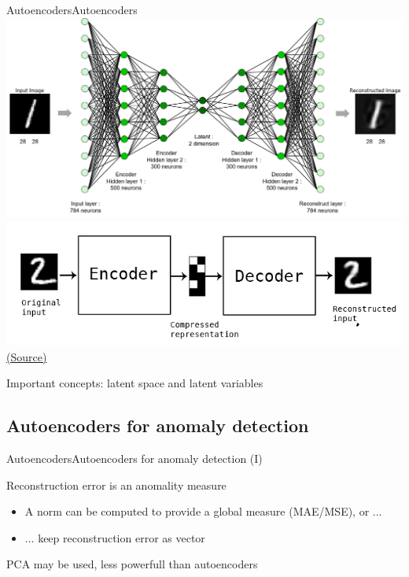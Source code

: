 \documentclass[10pt,compress]{beamer} %
\begin{document}
\begin{frame}{Autoencoders}{Autoencoders}
	\centering\includegraphics[width=0.75\linewidth]{figs/autoencoder.png}\\
	\centering\includegraphics[width=0.3\linewidth]{figs/autoencoder2.png}\\
	\scriptsize\href{http://i-systems.github.io/HSE545/machine\%20learning\%20all/KIMM/06\_KIMM\_Autoencoder.html}{(Source)}
	\medskip

	\normalsize

	\begin{flushleft}
	Important concepts: \alert{latent space} and \alert{latent variables}
	\end{flushleft}
\end{frame}

\subsection{Autoencoders for anomaly detection}

\begin{frame}{Autoencoders}{Autoencoders for anomaly detection (I)}
	
	\bigskip
	\alert{Reconstruction error} is an anomality measure
	\begin{itemize}
		\item A norm can be computed to provide a global measure (MAE/MSE), or ...
		\item ... keep reconstruction error as vector
	\end{itemize}
    PCA may be used, less powerfull than autoencoders
\end{frame}
\end{document}
